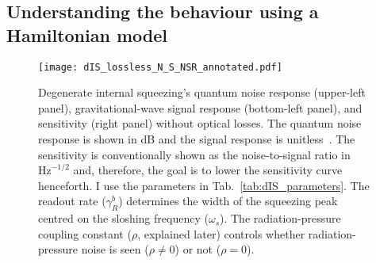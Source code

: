 \begin{comment}
	Inspecting $\text{T}\begin{bsmallmatrix}1 \\1\end{bsmallmatrix}$, i.e.\ the vector of signal transfer functions to each quadrature, shows that there are two terms: (1) rotates between the quadratures with the pump phase and (2) stays in the second quadrature and never vanishes with the pump phase\jam{(is it worth showing this?)}. I consider measuring the second quadrature at the photodetector since the signal is always there~\footnote{This does not mean that it is necessarily optimal to do so since the profile of the noise between the two quadratures is different to the signal, but it will suffice here~\cite{}.\jam{(What happens if I use $\phi=\pi$ and observe the first quadrature instead?)}}, and therefore the sensitivity ($\sqrt{S_h}$ is the noise-to-signal ratio) is
	\begin{equation}
	S_h = \frac{(\text{S}_X)_{2,2}}{\abs{(\text{T}\begin{bsmallmatrix}1 \\1\end{bsmallmatrix})_2}^2}.
	\end{equation}
\end{comment}


\subsection{Understanding the behaviour using a Hamiltonian model}
\label{sec:dIS_results}

\begin{figure}
	\centering
	\texttt{[image: dIS\_lossless\_N\_S\_NSR\_annotated.pdf]}
	\caption{ Degenerate internal squeezing's quantum noise response (upper-left panel), gravitational-wave signal response (bottom-left panel), and sensitivity (right panel) without optical losses. The quantum noise response is shown in dB and the signal response is unitless~\cite{danilishinQuantumMeasurementTheory2012}. The sensitivity is conventionally shown as the noise-to-signal ratio in $\text{Hz}^{-1/2}$ and, therefore, the goal is to lower the sensitivity curve henceforth. I use the parameters in Tab.~\ref{tab:dIS_parameters}. The readout rate ($\gamma^b_R$) determines the width of the squeezing peak centred on the sloshing frequency ($\omega_s$). %
	The radiation-pressure coupling constant ($\rho$, explained later) controls whether radiation-pressure noise is seen ($\rho\neq0$) or not ($\rho=0$).
	}
	\label{fig:dIS_sensitivity}
\end{figure}

